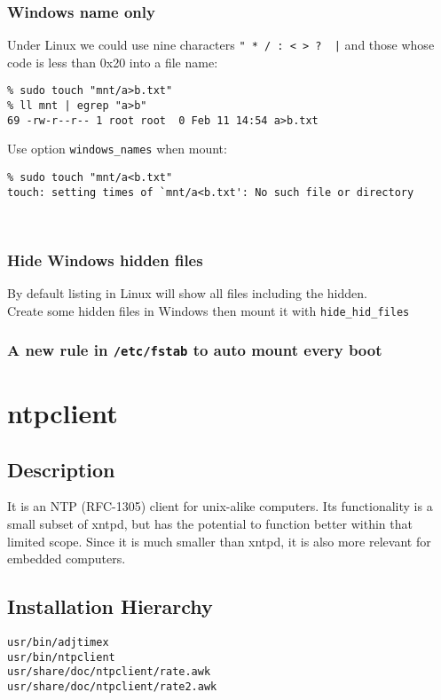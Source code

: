 \documentclass[a4paper]{report}
\begin{document}
\subsection{Windows name only}
Under Linux we could use nine characters {\tt " * / : < > ? \ |} and those whose code is
less than 0x20 into a file name:
\begin{lstlisting}
% sudo touch "mnt/a>b.txt"
% ll mnt | egrep "a>b"
69 -rw-r--r-- 1 root root  0 Feb 11 14:54 a>b.txt
\end{lstlisting}
Use option {\tt windows\_names} when mount:
\begin{lstlisting}
% sudo touch "mnt/a<b.txt"
touch: setting times of `mnt/a<b.txt': No such file or directory
\end{lstlisting}\null\\
\subsection{Hide Windows hidden files}
By default listing in Linux will show all files including the hidden.\\
Create some hidden files in Windows then mount it with {\tt hide\_hid\_files}

\subsection{A new rule in {\tt /etc/fstab} to auto mount every boot}


\chapter{ntpclient}
\section{Description}
It is an NTP (RFC-1305) client for unix-alike computers. 
Its functionality is a small subset of xntpd, but has the potential to function 
better within that limited scope. Since it is much smaller than xntpd, 
it is also more relevant for embedded computers.
\section{Installation Hierarchy}
\begin{lstlisting}
usr/bin/adjtimex
usr/bin/ntpclient
usr/share/doc/ntpclient/rate.awk
usr/share/doc/ntpclient/rate2.awk
\end{lstlisting}
\end{document}
